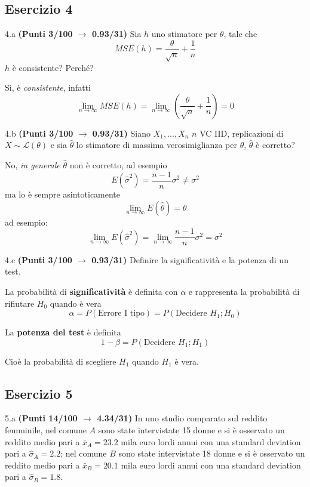 \documentclass[
  11pt,
]{book}
\theoremstyle{mytheoremstyle}
\theoremstyle{mydefstyle}
\newenvironment{sol}
  {
  \begin{tcolorbox}[enhanced,breakable,arc=0.1mm,boxrule=1pt,colback=white,colframe=iblue,
  title=\bf \fontfamily{lmss}\selectfont \hspace{.5 cm} Soluzione,drop fuzzy shadow]

}{
\end{tcolorbox}
  }
\begin{document}
\subsection{Esercizio 4}\label{esercizio-4-4}

4.a \textbf{(Punti 3/100 \(\rightarrow\) 0.93/31)} Sia \(h\) uno stimatore per \(\theta\), tale che
\[
MSE(h)=\frac\theta {\sqrt{ n}}+\frac1n
\]
\(h\) è consistente? Perché?

\begin{sol}
Sì, è \emph{consistente}, infatti
\[
\lim_{n\to\infty}MSE(h)=\lim_{n\to\infty}\left(\frac\theta {\sqrt{ n}}+\frac1n\right)=0
\]

\end{sol}

4.b \textbf{(Punti 3/100 \(\rightarrow\) 0.93/31)} Siano \(X_1,...,X_n\) \(n\) VC IID, replicazioni di \(X\sim \mathscr{L}(\theta)\) e sia \(\hat\theta\) lo stimatore di massima verosimiglianza per \(\theta\),
\(\hat\theta\) è corretto?

\begin{sol}
No, \emph{in generale} \(\hat\theta\) non è corretto, ad esempio
\[
E(\hat\sigma^2)=\frac{n-1}n\sigma^2\ne\sigma^2
\]
ma lo è sempre asintoticamente
\[
\lim_{n\to\infty}E(\hat\theta)=\theta
\]
ad esempio:
\[
\lim_{n\to\infty}E(\hat\sigma^2)=\lim_{n\to\infty}\frac{n-1}n\sigma^2=\sigma^2
\]

\end{sol}

4.c \textbf{(Punti 3/100 \(\rightarrow\) 0.93/31)} Definire la significatività e la potenza di un test.

\begin{sol}
La probabilità di \textbf{significatività} è definita con \(\alpha\) e rappresenta la probabilità di rifiutare \(H_0\) quando è vera
\[\alpha=P(\text{Errore I tipo})=P(\text{Decidere $H_1$};H_0)\]

La \textbf{potenza del test} è definita
\[1-\beta =P(\text{Decidere $H_1$}; H_1)\]

Cioè la probabilità di scegliere \(H_1\) quando \(H_1\) è vera.

\end{sol}

\subsection{Esercizio 5}\label{esercizio-5-2}

5.a \textbf{(Punti 14/100 \(\rightarrow\) 4.34/31)} In uno studio comparato sul reddito femminile, nel comune \(A\) sono state intervistate 15 donne e si è osservato un reddito medio pari a \(\bar x_A=23.2\) mila euro lordi annui con una standard deviation pari a \(\hat\sigma_A=2.2\); nel comune \(B\) sono state intervistate 18 donne e si è osservato un reddito medio pari a \(\bar x_B=20.1\) mila euro lordi annui con una standard deviation pari a \(\hat\sigma_B=1.8\).
\end{document}
